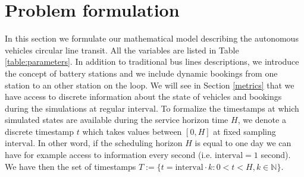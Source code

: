 \documentclass[12pt,a4paper]{article}
\begin{document}
\section{Problem formulation}
In this section we formulate our mathematical model describing the autonomous vehicles circular line transit. All the variables are listed in Table \ref{table:parameters}. In addition to traditional bus lines descriptions, we introduce the concept of battery stations and we include dynamic bookings from one station to an other station on the loop. We will see in Section \ref{metrics} that we have access to discrete information about the state of vehicles and bookings during the simulations at regular $\text{interval}$. To formalize the timestamps at which simulated states are available during the service horizon time $H$, we denote a discrete timestamp $t$ which takes values between $[0, H]$ at fixed sampling $\text{interval}$. In other word, if the scheduling horizon $H$ is equal to one day we can have for example access to information every second (i.e. $\text{interval} = 1$ second). We have then the set of timestamps $T :=\{t = \text{interval} \cdot k:  0 < t < H, k \in \mathbb{N}\}$.
\end{document}
